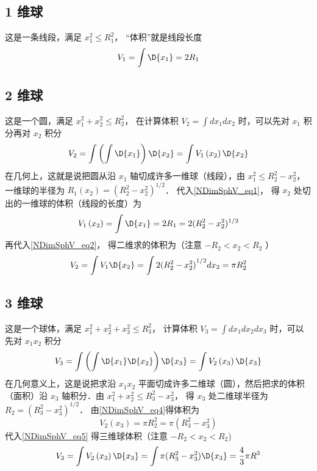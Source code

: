 \subsection{ 1 维球}
这是一条线段，满足 $x_1^2 \le R_1^2$， “体积”就是线段长度
\begin{equation}\label{NDimSphV_eq1}
{V_1} = \int {\D {x_1}}  = 2{R_1}
\end{equation}
\subsection{ 2 维球}
这是一个圆，满足 $x_1^2 + x_2^2 \le R_2^2$， 在计算体积 ${V_2} = \int {d{x_1}d{x_2}} $ 时，可以先对 ${x_1}$ 积分再对 ${x_2}$ 积分
\begin{equation}\label{NDimSphV_eq2}
{V_2} = \int {\left( {\int {\D {x_1}} } \right)\D {x_2}}  = \int {{V_1}\left( {x_2} \right)\D {x_2}} 
\end{equation}
在几何上，这就是说把圆从沿 ${x_1}$ 轴切成许多一维球（线段），由 $x_1^2 \le R_2^2 - x_2^2$， 一维球的半径为 ${R_1}\left( {x_2} \right) = {(R_2^2 - x_2^2)^{1/2}}$． 代入\autoref{NDimSphV_eq1}， 得 ${x_2}$ 处切出的一维球的体积（线段的长度）为
\begin{equation}\label{NDimSphV_eq3}
{V_1}\left( {x_2} \right) = \int {\D {x_1}}  = 2{R_1} = 2{(R_2^2 - x_2^2)^{1/2}}
\end{equation}
再代入\autoref{NDimSphV_eq2}， 得二维求的体积为（注意 $ - {R_2} < {x_2} < {R_2}$ ）
\begin{equation}\label{NDimSphV_eq4}
{V_2} = \int {{V_1}\D {x_2}}  = \int {2{{(R_2^2 - x_2^2)}^{1/2}}d{x_2}}  = \pi R_2^2
\end{equation}
\subsection{ 3 维球}
这是一个球体，满足 $x_1^2 + x_2^2 + x_3^2 \le R_3^2$， 计算体积 ${V_3} = \int {d{x_1}d{x_2}} d{x_3}$ 时，可以先对 ${x_1}{x_2}$ 积分
\begin{equation}\label{NDimSphV_eq5}
{V_3} = \int {\left( {\int {\D {x_1}\D {x_2}} } \right)\D {x_3}}  = \int {{V_2}\left( {x_3} \right)\D {x_3}} 
\end{equation}
在几何意义上，这是说把求沿 ${x_1}{x_2}$ 平面切成许多二维球（圆），然后把求的体积（面积）沿 ${x_3}$ 轴积分．由 $x_1^2 + x_2^2 \le R_3^2 - x_3^2$， 得 ${x_3}$ 处二维球半径为 ${R_2} = {(R_3^2 - x_3^2)^{1/2}}$． 由\autoref{NDimSphV_eq4}得体积为
\begin{equation}\label{NDimSphV_eq6}
{V_2}\left( {x_3} \right) = \pi R_2^2 = \pi (R_3^2 - x_3^2)
\end{equation}
代入\autoref{NDimSphV_eq5} 得三维球体积（注意 $ - {R_2} < {x_2} < {R_2}$)
\begin{equation}\label{NDimSphV_eq7}
{V_3} = \int {{V_2}\left( {x_3} \right)\D {x_3}}  = \int {\pi (R_3^2 - x_3^2)\D {x_3}}  = \frac{4}{3}\pi {R^3}
\end{equation}
